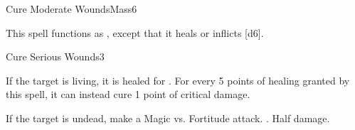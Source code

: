 \begin{spellsection}{Cure Moderate Wounds}{Mass}{6}
\begin{spellheader}
\end{spellheader}
\begin{spellcontent}
    \begin{spelltargetinginfo}
    \end{spelltargetinginfo}
    \begin{spelleffects}
        \spellspecial This spell functions as , except that it heals or inflicts [d6].
    \end{spelleffects}
\end{spellcontent}
\begin{spellfooter}
\end{spellfooter}
\end{spellsection}

\begin{spellsection}{Cure Serious Wounds}{3}
\begin{spellheader}
\end{spellheader}
\begin{spellcontent}
    \begin{spelltargetinginfo}
    \end{spelltargetinginfo}
    \begin{spelleffects}
        \spelleffect If the target is living, it is healed for . For every 5 points of healing granted by this spell, it can instead cure 1 point of critical damage.
        \begin{spellattacktriggered}{If the target is undead, make a Magic vs. Fortitude attack.}
            \spellsuccess {}.
            \spellfailure Half damage.
        \end{spellattacktriggered}
    \end{spelleffects}
\end{spellcontent}
\begin{spellfooter}
\end{spellfooter}
\end{spellsection}

